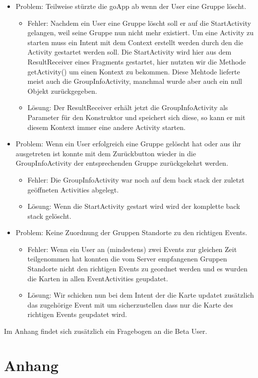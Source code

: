 \documentclass{scrartcl}
\begin{document}
		\begin{itemize}
			\item Problem: Teilweise stürzte die goApp ab wenn der User eine Gruppe löscht.
			\begin{itemize}
				\item Fehler: Nachdem ein User eine Gruppe löscht soll er auf die StartActivity gelangen, weil seine Gruppe nun nicht mehr existiert. Um eine Activity zu starten muss ein Intent mit dem Context erstellt werden durch den die  Activity gestartet werden soll. Die StartActivity wird hier aus dem ResultReceiver eines Fragments gestartet, hier nutzten wir die Methode getActivity() um einen Kontext zu bekommen. Diese Mehtode lieferte meist auch die GroupInfoActivity, manchmal wurde aber auch ein null Objekt zurückgegeben.
				\item Lösung: Der ResultReceiver erhält jetzt die GroupInfoActivity als Parameter für den Konstruktor und speichert sich diese, so kann er mit diesem Kontext immer eine andere Activity starten.
			\end{itemize}

			\item Problem: Wenn ein User erfolgreich eine Gruppe gelöscht hat oder aus ihr ausgetreten ist konnte mit dem Zurückbutton wieder in die GroupInfoActivity der entsprechenden Gruppe zurückgekehrt werden.
			\begin{itemize}
				\item Fehler: Die GroupInfoActivity war noch auf dem back stack der zuletzt geöffneten Activities abgelegt. 
				\item Lösung: Wenn die StartActivity gestart wird wird der komplette back stack gelöscht.
			\end{itemize}

			\item Problem: Keine Zuordnung der Gruppen Standorte zu den richtigen Events.
			\begin{itemize}
				\item Fehler: Wenn ein User an (mindestens) zwei Events zur gleichen Zeit teilgenommen hat konnten die vom Server empfangenen Gruppen Standorte nicht den richtigen Events zu geordnet werden und es wurden die Karten in allen EventActivities geupdatet.
				\item Lösung: Wir schicken nun bei dem Intent der die Karte updatet zusätzlich das zugehörige Event mit um sicherzustellen dass nur die Karte des richtigen Events geupdatet wird.
			\end{itemize}

			
		\end{itemize}
	
		Im Anhang findet sich zusätzlich ein Fragebogen an die Beta User.

\section{Anhang}
\end{document}
